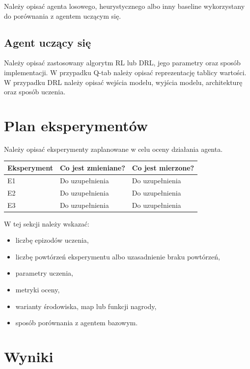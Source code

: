 \documentclass[12pt]{article}
\begin{document}
Należy opisać agenta losowego, heurystycznego albo inny baseline wykorzystany do porównania z agentem uczącym się.

\subsection{Agent uczący się}

Należy opisać zastosowany algorytm RL lub DRL, jego parametry oraz sposób implementacji. W przypadku Q-tab należy opisać reprezentację tablicy wartości. W przypadku DRL należy opisać wejścia modelu, wyjścia modelu, architekturę oraz sposób uczenia.

\section{Plan eksperymentów}

Należy opisać eksperymenty zaplanowane w celu oceny działania agenta.

\begin{center}
\begin{tabular}{p{}p{}p{}}
\toprule
Eksperyment & Co jest zmieniane? & Co jest mierzone? \\
\midrule
E1 & Do uzupełnienia & Do uzupełnienia \\
E2 & Do uzupełnienia & Do uzupełnienia \\
E3 & Do uzupełnienia & Do uzupełnienia \\
\bottomrule
\end{tabular}
\end{center}

W tej sekcji należy wskazać:
\begin{itemize}
    \item liczbę epizodów uczenia,
    \item liczbę powtórzeń eksperymentu albo uzasadnienie braku powtórzeń,
    \item parametry uczenia,
    \item metryki oceny,
    \item warianty środowiska, map lub funkcji nagrody,
    \item sposób porównania z agentem bazowym.
\end{itemize}

\section{Wyniki}
\end{document}
